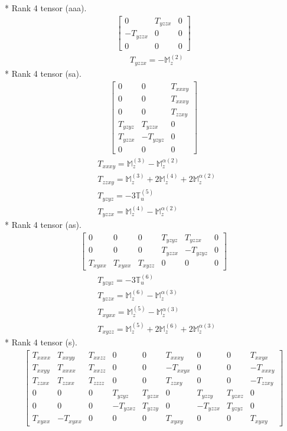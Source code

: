\documentclass[fleqn,8pt,landscape]{jsarticle}
\begin{document}
* Rank 4 tensor (aaa).
\begin{align*}
\begin{bmatrix} 0 & T_{yzzx} & 0 \\ - T_{yzzx} & 0 & 0 \\ 0 & 0 & 0 \end{bmatrix}
\end{align*}
\begin{align*}
& T_{yzzx} = - \mathbb{M}_{z}^{(2)}
\end{align*}
* Rank 4 tensor (sa).
\begin{align*}
\begin{bmatrix} 0 & 0 & T_{xxxy} \\ 0 & 0 & T_{xxxy} \\ 0 & 0 & T_{zzxy} \\ T_{yzyz} & T_{yzzx} & 0 \\ T_{yzzx} & - T_{yzyz} & 0 \\ 0 & 0 & 0 \end{bmatrix}
\end{align*}
\begin{align*}
& T_{xxxy} = \mathbb{M}_{z}^{(3)} - \mathbb{M}_{z}^{\alpha(2)} \\
& T_{zzxy} = \mathbb{M}_{z}^{(3)} + 2 \mathbb{M}_{z}^{(4)} + 2 \mathbb{M}_{z}^{\alpha(2)} \\
& T_{yzyz} = - 3 \mathbb{T}_{u}^{(5)} \\
& T_{yzzx} = \mathbb{M}_{z}^{(4)} - \mathbb{M}_{z}^{\alpha(2)}
\end{align*}
* Rank 4 tensor (as).
\begin{align*}
\begin{bmatrix} 0 & 0 & 0 & T_{yzyz} & T_{yzzx} & 0 \\ 0 & 0 & 0 & T_{yzzx} & - T_{yzyz} & 0 \\ T_{xyxx} & T_{xyxx} & T_{xyzz} & 0 & 0 & 0 \end{bmatrix}
\end{align*}
\begin{align*}
& T_{yzyz} = - 3 \mathbb{T}_{u}^{(6)} \\
& T_{yzzx} = \mathbb{M}_{z}^{(6)} - \mathbb{M}_{z}^{\alpha(3)} \\
& T_{xyxx} = \mathbb{M}_{z}^{(5)} - \mathbb{M}_{z}^{\alpha(3)} \\
& T_{xyzz} = \mathbb{M}_{z}^{(5)} + 2 \mathbb{M}_{z}^{(6)} + 2 \mathbb{M}_{z}^{\alpha(3)}
\end{align*}
* Rank 4 tensor (s).
\begin{align*}
\begin{bmatrix} T_{xxxx} & T_{xxyy} & T_{xxzz} & 0 & 0 & T_{xxxy} & 0 & 0 & T_{xxyx} \\ T_{xxyy} & T_{xxxx} & T_{xxzz} & 0 & 0 & - T_{xxyx} & 0 & 0 & - T_{xxxy} \\ T_{zzxx} & T_{zzxx} & T_{zzzz} & 0 & 0 & T_{zzxy} & 0 & 0 & - T_{zzxy} \\ 0 & 0 & 0 & T_{yzyz} & T_{yzzx} & 0 & T_{yzzy} & T_{yzxz} & 0 \\ 0 & 0 & 0 & - T_{yzxz} & T_{yzzy} & 0 & - T_{yzzx} & T_{yzyz} & 0 \\ T_{xyxx} & - T_{xyxx} & 0 & 0 & 0 & T_{xyxy} & 0 & 0 & T_{xyxy} \end{bmatrix}
\end{align*}
\end{document}
